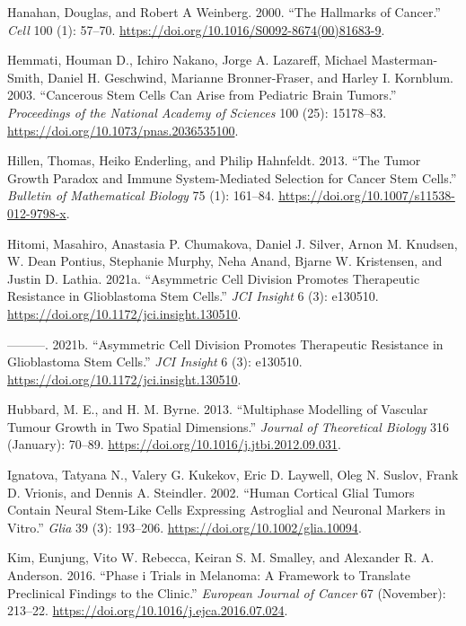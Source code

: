 \documentclass[
  letterpaper,
]{scrreprt}
\newlength{\cslhangindent}
\newenvironment{CSLReferences}[2] %
 {\begin{list}{}{%
  \setlength{\itemindent}{0pt}
  \setlength{\leftmargin}{0pt}
  \setlength{\parsep}{0pt}
  \ifodd #1
   \setlength{\leftmargin}{\cslhangindent}
   \setlength{\itemindent}{-1\cslhangindent}
  \fi
  \setlength{\itemsep}{#2\baselineskip}}}
 {\end{list}}
\theoremstyle{definition}
\theoremstyle{remark}
\begin{document}
\begin{CSLReferences}{1}{0}
Hanahan, Douglas, and Robert A Weinberg. 2000. {``The Hallmarks of
Cancer.''} \emph{Cell} 100 (1): 57--70.
\url{https://doi.org/10.1016/S0092-8674(00)81683-9}.

Hemmati, Houman D., Ichiro Nakano, Jorge A. Lazareff, Michael
Masterman-Smith, Daniel H. Geschwind, Marianne Bronner-Fraser, and
Harley I. Kornblum. 2003. {``Cancerous Stem Cells Can Arise from
Pediatric Brain Tumors.''} \emph{Proceedings of the National Academy of
Sciences} 100 (25): 15178--83.
\url{https://doi.org/10.1073/pnas.2036535100}.

Hillen, Thomas, Heiko Enderling, and Philip Hahnfeldt. 2013. {``The
Tumor Growth Paradox and Immune System-Mediated Selection for Cancer
Stem Cells.''} \emph{Bulletin of Mathematical Biology} 75 (1): 161--84.
\url{https://doi.org/10.1007/s11538-012-9798-x}.

Hitomi, Masahiro, Anastasia P. Chumakova, Daniel J. Silver, Arnon M.
Knudsen, W. Dean Pontius, Stephanie Murphy, Neha Anand, Bjarne W.
Kristensen, and Justin D. Lathia. 2021a. {``Asymmetric Cell Division
Promotes Therapeutic Resistance in Glioblastoma Stem Cells.''} \emph{JCI
Insight} 6 (3): e130510.
\url{https://doi.org/10.1172/jci.insight.130510}.

---------. 2021b. {``Asymmetric Cell Division Promotes Therapeutic
Resistance in Glioblastoma Stem Cells.''} \emph{JCI Insight} 6 (3):
e130510. \url{https://doi.org/10.1172/jci.insight.130510}.

Hubbard, M. E., and H. M. Byrne. 2013. {``Multiphase Modelling of
Vascular Tumour Growth in Two Spatial Dimensions.''} \emph{Journal of
Theoretical Biology} 316 (January): 70--89.
\url{https://doi.org/10.1016/j.jtbi.2012.09.031}.

Ignatova, Tatyana N., Valery G. Kukekov, Eric D. Laywell, Oleg N.
Suslov, Frank D. Vrionis, and Dennis A. Steindler. 2002. {``Human
Cortical Glial Tumors Contain Neural Stem{-}Like Cells Expressing
Astroglial and Neuronal Markers in Vitro.''} \emph{Glia} 39 (3):
193--206. \url{https://doi.org/10.1002/glia.10094}.

Kim, Eunjung, Vito W. Rebecca, Keiran S. M. Smalley, and Alexander R. A.
Anderson. 2016. {``Phase i Trials in Melanoma: A Framework to Translate
Preclinical Findings to the Clinic.''} \emph{European Journal of Cancer}
67 (November): 213--22.
\url{https://doi.org/10.1016/j.ejca.2016.07.024}.


\end{CSLReferences}
\end{document}

